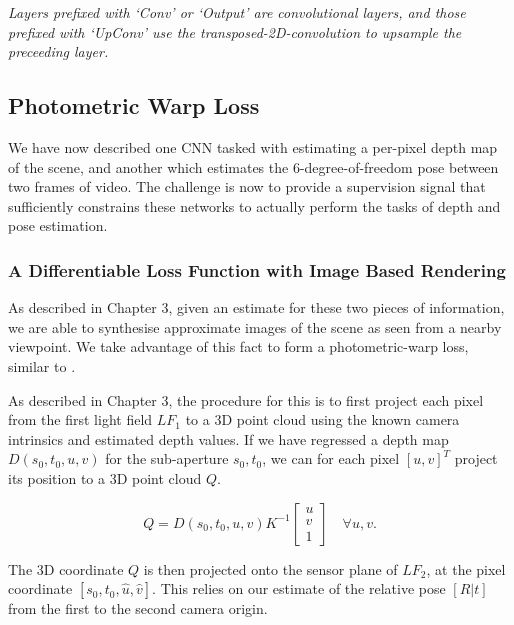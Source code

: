 \begin{table}[h]
    \vspace{4mm}{}
    \textit{Layers prefixed with `Conv' or `Output' are convolutional layers, and those prefixed with `UpConv' use the transposed-2D-convolution to upsample the preceeding layer.}
    
    \label{dispnet-layers}
\end{table}


\subsection{Photometric Warp Loss}
We have now described one CNN tasked with estimating a per-pixel depth map of the scene, and another which estimates the 6-degree-of-freedom pose between two frames of video. The challenge is now to provide a supervision signal that sufficiently constrains these networks to actually perform the tasks of depth and pose estimation. 

\subsubsection{A Differentiable Loss Function with Image Based Rendering}

As described in Chapter 3, given an estimate for these two pieces of information, we are able to synthesise approximate images of the scene as seen from a nearby viewpoint. We take advantage of this fact to form a photometric-warp loss, similar to \cite{zhou2017unsupervised}. 

As described in Chapter 3, the procedure for this is to first project each pixel from the first light field $LF_1$ to a 3D point cloud using the known camera intrinsics and estimated depth values. If we have regressed a depth map $D(s_0, t_0, u, v)$ for the sub-aperture $s_0, t_0$, we can for each pixel $[u, v]^T$ project its position to a 3D point cloud $Q$. 

\begin{equation}
    Q = D(s_0, t_0, u, v) K^{-1}\begin{bmatrix}u \\ v \\ 1\end{bmatrix} \quad \forall u, v.
\end{equation}

The 3D coordinate $Q$ is then projected onto the sensor plane of $LF_2$, at the pixel coordinate $[s_0,t_0,\hat{u},\hat{v}]$. This relies on our estimate of the relative pose $[R|t]$ from the first to the second camera origin.

